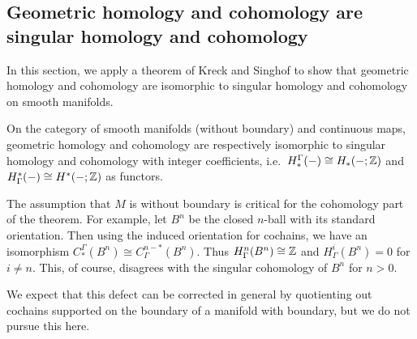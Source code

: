 \subsection{Geometric homology and cohomology are singular homology and cohomology}\label{S: homology is homology}

In this section, we apply a theorem of Kreck and Singhof to show that geometric homology and cohomology are isomorphic to singular homology and cohomology on smooth manifolds.

\begin{theorem}\label{T: geometric is singular}
	On the category of smooth manifolds (without boundary) and continuous maps, geometric homology and cohomology are respectively isomorphic to singular homology and cohomology with integer coefficients, i.e.\ $H_*^\Gamma(-) \cong H_*(- ;\mathbb{Z})$ and $H^*_\Gamma(-) \cong H^*(-;\mathbb{Z})$ as functors.
\end{theorem}

\begin{remark}
	The assumption that $M$ is without boundary is critical for the cohomology part of the theorem.
	For example, let $B^n$ be the closed $n$-ball with its standard orientation.
	Then using the induced orientation for cochains, we have an isomorphism $C_*^\Gamma(B^n) \cong C^{n-*}_\Gamma(B^n)$.
	Thus $H^n_\Gamma(B^n) \cong \mathbb{Z}$ and $H^i_\Gamma(B^n) = 0$ for $i \neq n$.
	This, of course, disagrees with the singular cohomology of $B^n$ for $n > 0$.

	We expect that this defect can be corrected in general by quotienting out cochains supported on the boundary of a manifold with boundary, but we do not pursue this here.
\end{remark}

